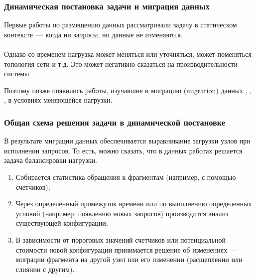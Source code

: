 \documentclass[unicode]{beamer}
\begin{document}
\begin{frame}
\frametitle{Динамическая постановка задачи и миграция данных}

\begin{block}{}
Первые работы по размещению данных рассматривали задачу в статическом контексте~--- когда ни запросы, ни данные не изменяются. 
\\~\\
Однако со временем нагрузка может меняться или уточняться, может поменяться топология сети \cite{p34} и т.д. Это может негативно сказаться на производительности системы.

\end{block}{}

Поэтому позже появились работы, изучавшие и миграцию (migration) данных \cite{p34}, \cite{p35}, \cite{p36}, \cite{p37} в условиях меняющейся нагрузки. 

\end{frame}

\begin{frame}
\frametitle{Общая схема решения задачи в динамической постановке}

В результате миграции данных обеспечивается выравнивание загрузки узлов при исполнении запросов. То есть, можно сказать, что в данных работах решается задача балансировки нагрузки.

\begin{enumerate}
  \setlength\itemsep{1em}		
  \item Собирается статистика обращения к фрагментам (например, с помощью счетчиков);

  \item Через определенный промежуток времени или по выполнению определенных условий (например, появлению новых запросов) производится анализ существующей конфигурации;

  \item В зависимости от пороговых значений счетчиков или потенциальной стоимости новой конфигурации принимается решение об изменениях~--- миграции фрагмента на другой узел или его изменении (расщеплении или слиянии с другим). 
\end{enumerate}
\end{frame}
\end{document}
